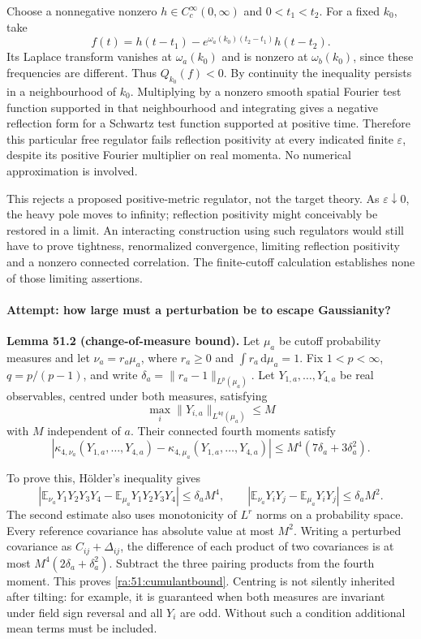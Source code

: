 \documentclass[11pt]{article}
\newcommand{\E}{\mathbb{E}}
\newcommand{\dd}{\,\mathrm d}
\begin{document}
Choose a nonnegative nonzero $h\in C_c^\infty(0,\infty)$ and $0<t_1<t_2$.
For a fixed $k_0$, take
\[
 f(t)=h(t-t_1)-e^{\omega_a(k_0)(t_2-t_1)}h(t-t_2).
\]
Its Laplace transform vanishes at $\omega_a(k_0)$ and is nonzero at
$\omega_b(k_0)$, since these frequencies are different. Thus
$Q_{k_0}(f)<0$. By continuity the inequality persists in a neighbourhood
of $k_0$. Multiplying by a nonzero smooth spatial Fourier test function
supported in that neighbourhood and integrating gives a negative
reflection form for a Schwartz test function supported at positive time.
Therefore this particular free regulator fails reflection positivity at
every indicated finite $\varepsilon$, despite its positive Fourier
multiplier on real momenta. No numerical approximation is involved.

This rejects a proposed positive-metric regulator, not the target theory.
As $\varepsilon\downarrow0$, the heavy pole moves to infinity; reflection
positivity might conceivably be restored in a limit. An interacting
construction using such regulators would still have to prove tightness,
renormalized convergence, limiting reflection positivity and a nonzero
connected correlation. The finite-cutoff calculation establishes none of
those limiting assertions.

\paragraph{Attempt: how large must a perturbation be to escape Gaussianity?}
\textbf{Lemma 51.2 (change-of-measure bound).} Let $\mu_a$ be cutoff
probability measures and let $\nu_a=r_a\mu_a$, where $r_a\ge0$ and
$\int r_a\dd\mu_a=1$. Fix $1<p<\infty$, $q=p/(p-1)$, and write
$\delta_a=\|r_a-1\|_{L^p(\mu_a)}$. Let $Y_{1,a},\ldots,Y_{4,a}$ be real
observables, centred under both measures, satisfying
\[
 \max_i\|Y_{i,a}\|_{L^{4q}(\mu_a)}\le M
\]
with $M$ independent of $a$. Their connected fourth moments satisfy
\begin{equation}\label{ra:51:cumulantbound}
 |\kappa_{4,\nu_a}(Y_{1,a},\ldots,Y_{4,a})
       -\kappa_{4,\mu_a}(Y_{1,a},\ldots,Y_{4,a})|
 \le M^4(7\delta_a+3\delta_a^2).
\end{equation}

To prove this, H\"older's inequality gives
\[
 |\E_{\nu_a}Y_1Y_2Y_3Y_4-\E_{\mu_a}Y_1Y_2Y_3Y_4|
 \le\delta_a M^4,
 \qquad
 |\E_{\nu_a}Y_iY_j-\E_{\mu_a}Y_iY_j|
 \le\delta_a M^2.
\]
The second estimate also uses monotonicity of $L^r$ norms on a probability
space. Every reference covariance has absolute value at most $M^2$.
Writing a perturbed covariance as $C_{ij}+\Delta_{ij}$, the difference of
each product of two covariances is at most
$M^4(2\delta_a+\delta_a^2)$. Subtract the three pairing products from the
fourth moment. This proves \eqref{ra:51:cumulantbound}. Centring is not
silently inherited after tilting: for example, it is guaranteed when both
measures are invariant under field sign reversal and all $Y_i$ are odd.
Without such a condition additional mean terms must be included.
\end{document}
